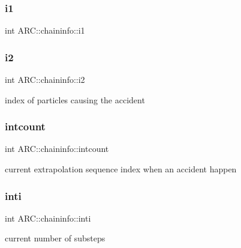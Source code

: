 \hypertarget{classARC_1_1chaininfo_a50deb77aefe8f664d65f7320098d4726}{}\label{classARC_1_1chaininfo_a50deb77aefe8f664d65f7320098d4726} 
\subsubsection{\texorpdfstring{i1}{i1}}
{\footnotesize\ttfamily int A\+R\+C\+::chaininfo\+::i1}

\hypertarget{classARC_1_1chaininfo_a60f94a1f01c83934ad975f5d82638ef1}{}\label{classARC_1_1chaininfo_a60f94a1f01c83934ad975f5d82638ef1} 
\subsubsection{\texorpdfstring{i2}{i2}}
{\footnotesize\ttfamily int A\+R\+C\+::chaininfo\+::i2}



index of particles causing the accident 

\hypertarget{classARC_1_1chaininfo_a0bd3d3a4b97bba8fa1baea9f077f30a7}{}\label{classARC_1_1chaininfo_a0bd3d3a4b97bba8fa1baea9f077f30a7} 
\subsubsection{\texorpdfstring{intcount}{intcount}}
{\footnotesize\ttfamily int A\+R\+C\+::chaininfo\+::intcount}



current extrapolation sequence index when an accident happen 

\hypertarget{classARC_1_1chaininfo_ab043612acf18c1c850737f67bcb6e141}{}\label{classARC_1_1chaininfo_ab043612acf18c1c850737f67bcb6e141} 
\subsubsection{\texorpdfstring{inti}{inti}}
{\footnotesize\ttfamily int A\+R\+C\+::chaininfo\+::inti}



current number of substeps 

